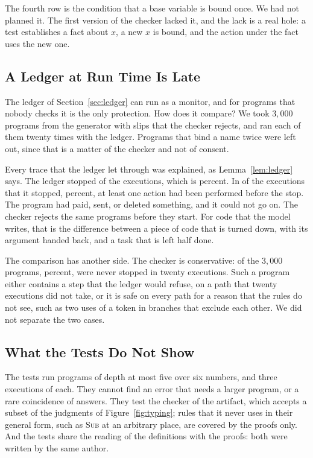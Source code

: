 \documentclass[acmsmall,nonacm,screen]{acmart}
\begin{document}
The fourth row is the condition that a base variable is bound once. We had not planned it. The
first version of the checker lacked it, and the lack is a real hole: a test establishes a fact
about $x$, a new $x$ is bound, and the action under the fact uses the new one.

\subsection{A Ledger at Run Time Is Late}
\label{sec:late}

The ledger of Section~\ref{sec:ledger} can run as a monitor, and for programs that nobody
checks it is the only protection. How does it compare? We took $3{,}000$ programs from the
generator with slips that the checker rejects, and ran each of them twenty times with the
ledger. Programs that bind a name twice were left out, since that is a matter of the checker
and not of consent.

Every trace that the ledger let through was explained, as Lemma~\ref{lem:ledger} says. The
ledger stopped \exStopped{} of the \exRejectedRuns{} executions, which is \exStoppedPercent{}
percent. In \exLate{} of the executions that it stopped, \exLatePercent{} percent, at least one
action had been performed before the stop. The program had paid, sent, or deleted something,
and it could not go on. The checker rejects the same programs before they start. For code that
the model writes, that is the difference between a piece of code that is turned down, with its
argument handed back, and a task that is left half done.

The comparison has another side. The checker is conservative: \exQuiet{} of the $3{,}000$
programs, \exQuietPercent{} percent, were never stopped in twenty executions. Such a program
either contains a step that the ledger would refuse, on a path that twenty executions did not
take, or it is safe on every path for a reason that the rules do not see, such as two uses of
a token in branches that exclude each other. We did not separate the two cases.

\subsection{What the Tests Do Not Show}

The tests run programs of depth at most five over six numbers, and three executions of each.
They cannot find an error that needs a larger program, or a rare coincidence of answers. They
test the checker of the artifact, which accepts a subset of the judgments of
Figure~\ref{fig:typing}; rules that it never uses in their general form, such as \textsc{Sub}
at an arbitrary place, are covered by the proofs only. And the tests share the reading of the
definitions with the proofs: both were written by the same author.
\end{document}
